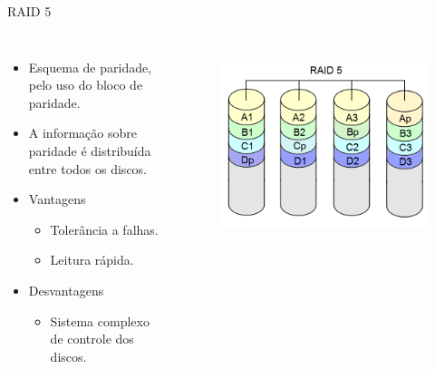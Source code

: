 \begin{frame}{RAID 5}
	\begin{columns}
		\begin{itemize}
			\item Esquema de paridade, pelo uso do bloco de paridade.
			\item A informação sobre paridade é distribuída entre todos os discos.
			\item Vantagens
			\begin{itemize}
				\item Tolerância a falhas.
				\item Leitura rápida.
			\end{itemize}
			\item Desvantagens
			\begin{itemize}
				\item Sistema complexo de controle dos discos.
			\end{itemize}
		\end{itemize}
		
		\begin{figure}
			\includegraphics[width=\textwidth]{imagens/RAID_5}
			\label{fig:exemplo}
		\end{figure}
		
	\end{columns}
\end{frame}